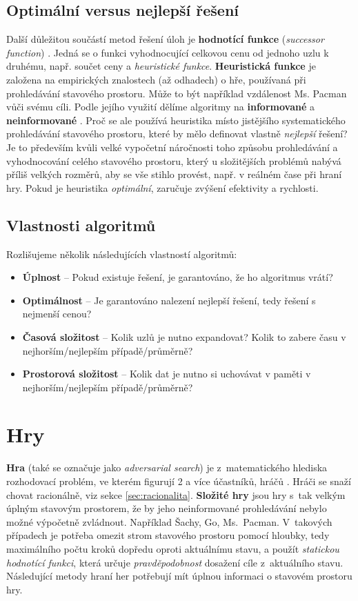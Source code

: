 \subsection*{Optimální versus nejlepší řešení}
Další důležitou součástí metod řešení úloh je \textbf{hodnotící funkce} (\textit{successor function}) \cite{AI1}. Jedná se o funkci vyhodnocující celkovou cenu od jednoho uzlu k druhému, např. součet ceny a \textit{heuristické funkce}. \textbf{Heuristická funkce} \cite{berkeley} je založena na empirických znalostech (až odhadech) o hře, používaná při prohledávání stavového prostoru. Může to být například vzdálenost Ms. Pacman vůči svému cíli. Podle jejího využití dělíme algoritmy na \textbf{informované} a \textbf{neinformované} \cite{AI1}.
Proč se ale používá heuristika místo jistějšího systematického prohledávání stavového prostoru, které by mělo definovat vlastně \textit{nejlepší} řešení? Je to především kvůli velké vypočetní náročnosti toho způsobu prohledávání a vyhodnocování celého stavového prostoru, který u složitějších problémů nabývá příliš velkých rozměrů, aby se vše stihlo provést, např. v reálném čase při hraní hry. Pokud je heuristika \textit{optimální}, zaručuje zvýšení efektivity a rychlosti.
\newpage
\subsection*{Vlastnosti algoritmů}
Rozlišujeme několik následujících vlastností algoritmů\cite{AI1}:
\begin{itemize}
\item \textbf{Úplnost} – Pokud existuje řešení, je garantováno, že ho algoritmus vrátí?
\item \textbf{Optimálnost} – Je garantováno nalezení nejlepší řešení, tedy řešení s nejmenší cenou?
\item \textbf{Časová složitost} – Kolik uzlů je nutno expandovat? Kolik to zabere času v nejhorším/nejlepším případě/průměrně?
\item \textbf{Prostorová složitost} – Kolik dat je nutno si uchovávat v paměti v nejhorším/nejlepším případě/průměrně?
\end{itemize}

\section{Hry}
\textbf{Hra} (také se označuje jako \textit{adversarial search}) je z matematického hlediska rozhodovací problém, ve kterém figurují 2 a více účastníků, hráčů \cite{AI1}. Hráči se snaží chovat racionálně, viz sekce \ref{sec:racionalita}.
\newline
\textbf{Složité hry} \cite{AI1} jsou hry s tak velkým úplným stavovým prostorem, že by jeho neinformované prohledávání nebylo možné výpočetně zvládnout. Například Šachy, Go, Ms. Pacman. V takových případech je potřeba omezit strom stavového prostoru pomocí hloubky, tedy maximálního počtu kroků dopředu oproti aktuálnímu stavu, a použít \textit{statickou hodnotící funkci}, která určuje \textit{pravděpodobnost} dosažení cíle z aktuálního stavu. Následující metody hraní her potřebují mít úplnou informaci o stavovém prostoru hry.
